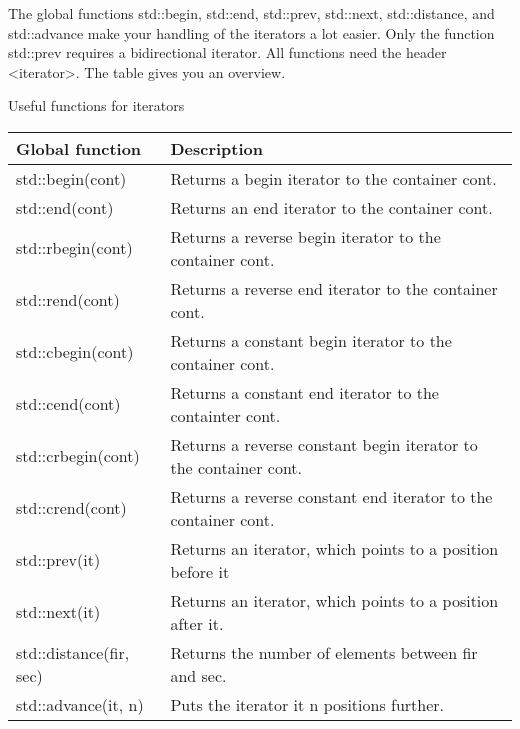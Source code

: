 The global functions std::begin, std::end, std::prev, std::next, std::distance, and std::advance make your handling of the iterators a lot easier. Only the function std::prev requires a bidirectional iterator. All functions need the header <iterator>. The table gives you an overview.

\begin{center}
Useful functions for iterators
\end{center}

\begin{longtable}[c]{|l|l|}
\hline
\textbf{Global function} & \textbf{Description}                                      \\ \hline
\endfirsthead
%
\endhead
%
std::begin(cont)         & Returns a begin iterator to the container cont.           \\ \hline
std::end(cont)           & Returns an end iterator to the container cont.            \\ \hline
std::rbegin(cont)        & Returns a reverse begin iterator to the container cont.   \\ \hline
std::rend(cont)          & Returns a reverse end iterator to the container cont.     \\ \hline
std::cbegin(cont)        & Returns a constant begin iterator to the container cont.  \\ \hline
std::cend(cont)          & Returns a constant end iterator to the containter cont.   \\ \hline
std::crbegin(cont)      & Returns a reverse constant begin iterator to the container cont. \\ \hline
std::crend(cont)        & Returns a reverse constant end iterator to the container cont.   \\ \hline
std::prev(it)            & Returns an iterator, which points to a position before it \\ \hline
std::next(it)            & Returns an iterator, which points to a position after it. \\ \hline
std::distance(fir, sec) & Returns the number of elements between fir and sec.              \\ \hline
std::advance(it, n)      & Puts the iterator it n positions further.                 \\ \hline
\end{longtable}

